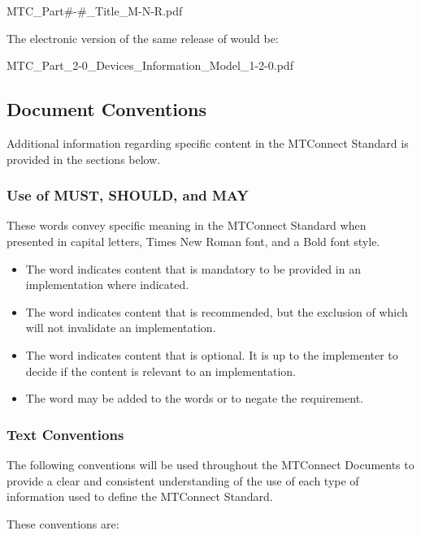 \tab MTC\_Part\#-\#\_Title\_M-N-R.pdf 

The electronic version of the same release of  would be:

\tab MTC\_Part\_2-0\_Devices\_Information\_Model\_1-2-0.pdf

\subsection{Document Conventions}

Additional information regarding specific content in the MTConnect Standard is provided in the sections below.

\subsubsection{Use of MUST, SHOULD, and MAY}

These words convey specific meaning in the MTConnect Standard when presented in capital letters, Times New Roman font, and a Bold font style. 

\begin{itemize}
\item	The word \MUST indicates content that is mandatory to be provided in an implementation where indicated.

\item	The word \SHOULD indicates content that is recommended, but the exclusion of which will not invalidate an implementation.

\item	The word \MAY indicates content that is optional.  It is up to the implementer to decide if the content is relevant to an implementation.

\item 	The word \NOT may be added to the words \MUST or \SHOULD to negate the requirement.
\end{itemize}

\subsubsection{Text Conventions}

The following conventions will be used throughout the MTConnect Documents to provide a clear and consistent understanding of the use of each type of information used to define the MTConnect Standard.

These conventions are:

